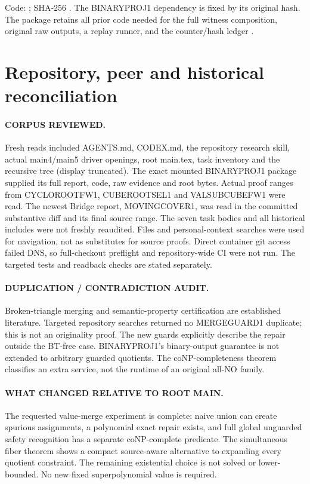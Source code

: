 \documentclass[11pt]{article}
\begin{document}
Code: ; SHA-256
.
The BINARYPROJ1 dependency is fixed by its original hash. The package retains
all prior code needed for the full witness composition, original raw outputs,
a replay runner, and the counter/hash ledger
.

\section{Repository, peer and historical reconciliation}
\paragraph{CORPUS REVIEWED.}
Fresh reads included AGENTS.md, CODEX.md, the repository research skill,
actual main4/main5 driver openings, root main.tex, task inventory and the
recursive tree (display truncated). The exact mounted BINARYPROJ1 package
supplied its full report, code, raw evidence and root bytes. Actual proof
ranges from CYCLOROOTFW1, CUBEROOTSEL1 and VALSUBCUBEFW1 were read. The newest
Bridge report, MOVINGCOVER1, was read in the committed substantive diff and
its final source range. The seven task bodies and all historical includes
were not freshly reaudited. Files and personal-context searches were used
for navigation, not as substitutes for source proofs. Direct container git
access failed DNS, so full-checkout preflight and repository-wide CI were
not run. The targeted tests and readback checks are stated separately.

\paragraph{DUPLICATION / CONTRADICTION AUDIT.}
Broken-triangle merging and semantic-property certification are established
literature. Targeted repository searches returned no MERGEGUARD1 duplicate;
this is not an originality proof. The new guards explicitly describe the
repair outside the BT-free case. BINARYPROJ1's binary-output guarantee is
not extended to arbitrary guarded quotients. The coNP-completeness theorem
classifies an extra service, not the runtime of an original all-NO family.

\paragraph{WHAT CHANGED RELATIVE TO ROOT MAIN.}
The requested value-merge experiment is complete: naive union can create
spurious assignments, a polynomial exact repair exists, and full global
unguarded safety recognition has a separate coNP-complete predicate. The
simultaneous fiber theorem shows a compact source-aware alternative to
expanding every quotient constraint. The remaining existential choice is
not solved or lower-bounded. No new fixed superpolynomial value is required.
\end{document}
